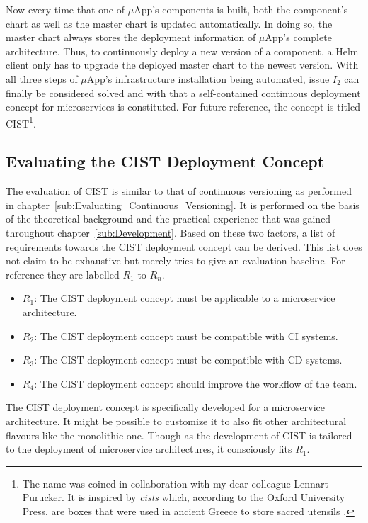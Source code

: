 Now every time that one of $\mu$App's components is built, both the component's
chart as well as the master chart is updated automatically. In doing so, the
master chart always stores the deployment information of $\mu$App's complete
architecture. Thus, to continuously deploy a new version of a component, a Helm
client only has to upgrade the deployed master chart to the newest version.
With all three steps of $\mu$App's infrastructure installation being automated,
issue $I_2$ can finally be considered solved and with that a self-contained
continuous deployment concept for microservices is constituted.  For future
reference, the concept is titled \acf{CIST}\footnote{The name was coined in
  collaboration with my dear colleague Lennart Purucker. It is inspired by
  \textit{cists} which, according to the Oxford University Press, are boxes
  that were used in ancient Greece to store sacred utensils
\autocite{Presscist}.}.

\subsection{Evaluating the \acf{CIST} Deployment Concept}%
\label{sub:Evaluating_the_CIST_Deployment_Concept}

The evaluation of \ac{CIST} is similar to that of continuous versioning as
performed in chapter~\ref{sub:Evaluating_Continuous_Versioning}. It is
performed on the basis of the theoretical background and the practical
experience that was gained throughout chapter~\ref{sub:Development}. Based on
these two factors, a list of requirements towards the \ac{CIST} deployment
concept can be derived. This list does not claim to be exhaustive but merely
tries to give an evaluation baseline. For reference they are labelled $R_1$ to
$R_n$.

\begin{itemize}
  \item \textit{$R_1$}: The \ac{CIST} deployment concept must be applicable to
    a microservice architecture.
  \item \textit{$R_2$}: The \ac{CIST} deployment concept must be compatible
    with \ac{CI} systems.
  \item \textit{$R_3$}: The \ac{CIST} deployment concept must be compatible
    with \ac{CD} systems.
  \item \textit{$R_4$}: The \ac{CIST} deployment concept should improve the
    workflow of the team.
\end{itemize}

The \ac{CIST} deployment concept is specifically developed for a microservice
architecture. It might be possible to customize it to also fit other
architectural flavours like the monolithic one. Though as the development of
\ac{CIST} is tailored to the deployment of microservice architectures, it
consciously fits $R_1$.

